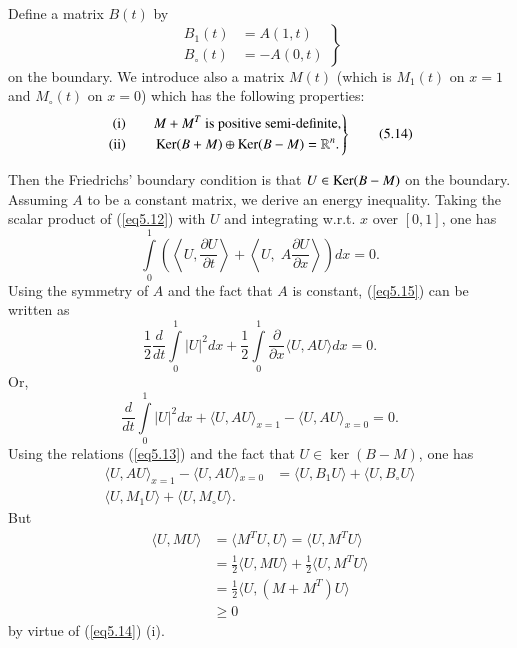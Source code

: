 Define a matrix $B(t)$ by 
\begin{equation*}
\left. 
\begin{aligned}
B_1 (t) & = A(1,t)\\
B_\circ (t) & = -A (0, t)
\end{aligned} \right\}
\tag{5.13}\label{eq5.13}
\end{equation*}
on the boundary. We introduce also a matrix $M(t)$ (which is $M_1(t)$
on $x=1$ and $M_\circ(t)$ on $x=0$) which has the following properties:
\begin{equation*}
\left.
\begin{aligned}
{\rm (i)}  \qquad & M + M^T \text{ is positive semi-definite},\\
{\rm (ii)} \qquad & \operatorname{Ker} (B+M) \oplus \operatorname{Ker} (B-M) = \mathbb{R}^n. 
\end{aligned}
\right\}
\tag{5.14}\label{eq5.14}
\end{equation*}\pageoriginale

Then the Friedrichs' boundary condition is that $U \in \operatorname{Ker} (B-M)$ on
the boundary. Assuming $A$ to be a constant matrix, we derive an
energy inequality. Taking the scalar product of (\ref{eq5.12}) with $U$ and
integrating w.r.t. $x$ over $[0,1]$, one has
\begin{equation*}
\int\limits^1_0 \left(\left\langle U, \frac{\partial U}{\partial
  t}\right\rangle + \left\langle U, \; A \frac{\partial U}{\partial x}
\right\rangle\right) dx =0. 
\tag{5.15}\label{eq5.15}
\end{equation*}
Using the symmetry of $A$ and the fact that $A$ is constant, (\ref{eq5.15})
can be written as
$$
\frac{1}{2} \frac{d}{dt} \int\limits^1_0 |U|^2 dx + \frac{1}{2}
\int\limits^1_0 \frac{\partial}{\partial x} \langle U, AU\rangle dx = 0.
$$
Or,
\begin{equation*}
\frac{d}{dt} \int\limits^1_0 |U|^2 dx + \langle U, AU \rangle_{x=1} -
\langle U, AU\rangle_{x=0} = 0. \tag{5.16}\label{eq5.16}
\end{equation*}
Using the relations (\ref{eq5.13}) and the fact that $U \in \ker (B-M)$, one
has 
\begin{align*}
\langle U, AU\rangle _{x=1} - \langle U, AU\rangle {}_{x=0} & =
\langle U, B_1 U \rangle  + \langle U, B_\circ U\rangle \\
\langle U, M_1 U \rangle  + \langle U, M_\circ U \rangle .
\end{align*}
But
\begin{align*}
\langle U, MU\rangle & =  \langle M^T U, U\rangle = \langle U, M^TU\rangle \\
& = \frac{1}{2} \langle U, MU \rangle + \frac{1}{2}\langle  U, M^TU\rangle \\
& = \frac{1}{2} \langle  U, (M+M^T) U\rangle \\
& \geq 0
\end{align*}
by virtue of (\ref{eq5.14}) (i).

